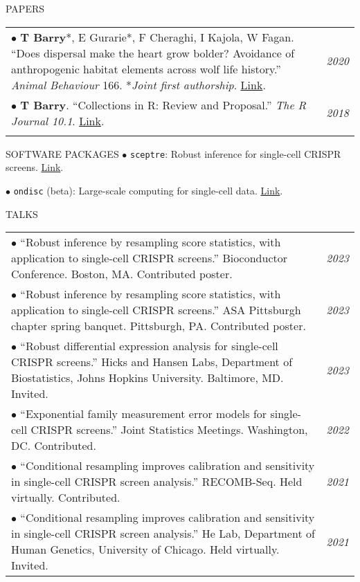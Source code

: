 \documentclass{resume} %
\begin{document}
\begin{rSection}{PAPERS}
\begin{tabular}{p{14cm}R{2.5cm}}
	$\bullet$ \textbf{T Barry}*, E Gurarie*, F Cheraghi, I Kajola, W Fagan. ``Does dispersal make the heart grow bolder? Avoidance of anthropogenic habitat elements across wolf life history.'' \textit{Animal Behaviour} 166. *\textit{Joint first authorship}. \href{https://www.sciencedirect.com/science/article/pii/S0003347220301743}{Link}. & \textit{2020}  \\
	$\bullet$ \textbf{T Barry}. ``Collections in R: Review and Proposal.'' \textit{The R Journal 10.1}. \href{https://journal.r-project.org/archive/2018/RJ-2018-037/index.html}{Link}. & \textit{2018} \\ &
\end{tabular} 	
\end{rSection}


\begin{rSection}{SOFTWARE PACKAGES}
	$\bullet$ \texttt{sceptre}: Robust inference for single-cell CRISPR screens. \href{https://katsevich-lab.github.io/sceptre/}{Link}.
	
	$\bullet$ \texttt{ondisc} (beta): Large-scale computing for single-cell data. \href{https://github.com/timothy-barry/ondisc}{Link}.
\end{rSection}

\begin{rSection}{TALKS}
	
	\begin{tabular}{p{14cm}R{2.5cm}}
		$\bullet$ ``Robust inference by resampling score statistics, with application to single-cell CRISPR screens.'' Bioconductor Conference. Boston, MA. Contributed poster.&\textit{2023}\\
		
		$\bullet$ ``Robust inference by resampling score statistics, with application to single-cell CRISPR screens.'' ASA Pittsburgh chapter spring
		banquet. Pittsburgh, PA. Contributed poster. & \it{2023} \\
		
		$\bullet$ ``Robust differential expression analysis for single-cell CRISPR screens.'' Hicks and Hansen Labs, Department of Biostatistics, Johns Hopkins University. Baltimore, MD. Invited. & \it{2023} \\
		
		$\bullet$ ``Exponential family measurement error models for single-cell CRISPR screens.'' Joint Statistics Meetings. Washington, DC. Contributed.  & \it{2022} \\
		
		$\bullet$  ``Conditional resampling improves calibration and sensitivity in single-cell CRISPR screen analysis.'' RECOMB-Seq. Held virtually. Contributed. & \it{2021} \\
		
		$\bullet$ ``Conditional resampling improves calibration and sensitivity in single-cell CRISPR screen analysis.'' He Lab, Department of Human Genetics, University of Chicago. Held virtually. Invited. & \it{2021}
	\end{tabular}
	
\end{rSection}
\end{document}
